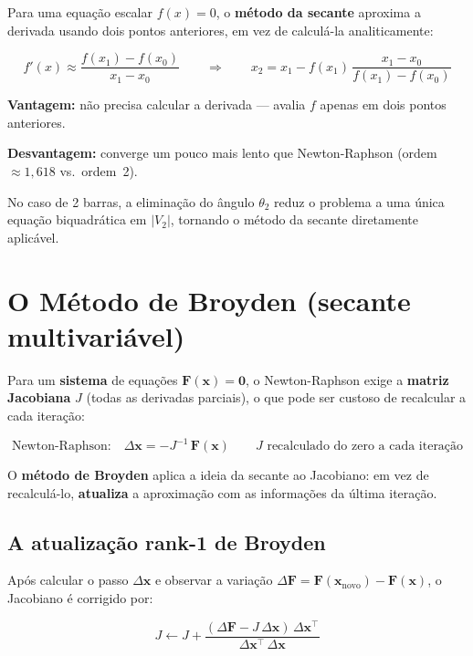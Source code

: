 \documentclass[
  12pt,
  a4paper,
  oneside,
  brazil
]{abntex2}
\begin{document}
Para uma equação escalar $f(x) = 0$, o \textbf{método da secante}
aproxima a derivada usando dois pontos anteriores, em vez de calculá-la
analiticamente:

\begin{equation}
  f'(x) \approx \frac{f(x_1) - f(x_0)}{x_1 - x_0}
  \qquad \Rightarrow \qquad
  x_2 = x_1 - f(x_1)\,\frac{x_1 - x_0}{f(x_1) - f(x_0)}
\end{equation}

\textbf{Vantagem:} não precisa calcular a derivada — avalia $f$ apenas em
dois pontos anteriores.

\textbf{Desvantagem:} converge um pouco mais lento que Newton-Raphson
(ordem $\approx 1{,}618$ vs.\ ordem~2).

No caso de 2 barras, a eliminação do ângulo $\theta_2$ reduz o problema a
uma única equação biquadrática em $|V_2|$, tornando o método da secante
diretamente aplicável.

\chapter{O Método de Broyden (secante multivariável)}

Para um \textbf{sistema} de equações $\mathbf{F}(\mathbf{x}) = \mathbf{0}$,
o Newton-Raphson exige a \textbf{matriz Jacobiana} $J$ (todas as derivadas
parciais), o que pode ser custoso de recalcular a cada iteração:

\begin{equation}
  \text{Newton-Raphson:} \quad
  \Delta\mathbf{x} = -J^{-1}\,\mathbf{F}(\mathbf{x})
  \qquad J \text{ recalculado do zero a cada iteração}
\end{equation}

O \textbf{método de Broyden} aplica a ideia da secante ao Jacobiano: em
vez de recalculá-lo, \textbf{atualiza} a aproximação com as informações
da última iteração.

\section{A atualização rank-1 de Broyden}

Após calcular o passo $\Delta\mathbf{x}$ e observar a variação
$\Delta\mathbf{F} = \mathbf{F}(\mathbf{x}_{\text{novo}}) - \mathbf{F}(\mathbf{x})$,
o Jacobiano é corrigido por:

\begin{equation}
  \boxed{
    J \leftarrow J +
    \frac{(\Delta\mathbf{F} - J\,\Delta\mathbf{x})\,\Delta\mathbf{x}^\top}
         {\Delta\mathbf{x}^\top\,\Delta\mathbf{x}}
  }
\end{equation}
\end{document}
